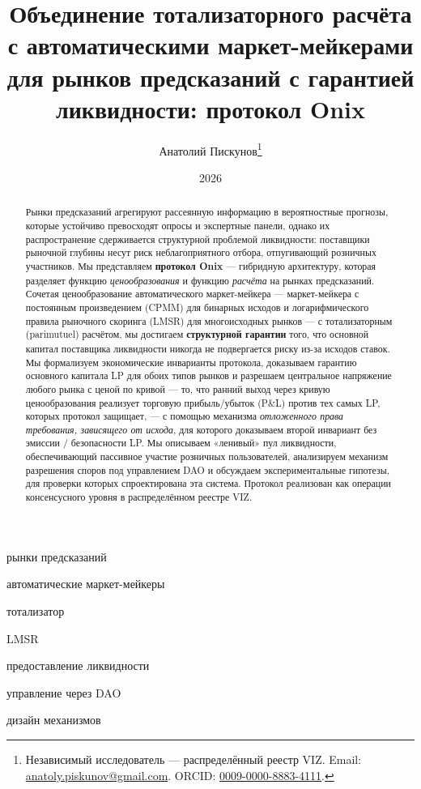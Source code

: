 \documentclass{ledger}
\title{Объединение тотализаторного расчёта с автоматическими маркет-мейкерами
для рынков предсказаний с гарантией ликвидности: протокол Onix}
\author{Анатолий Пискунов\thanks{Независимый исследователь --- распределённый
реестр VIZ. Email: \href{mailto:anatoly.piskunov@gmail.com}{anatoly.piskunov@gmail.com}.
ORCID: \href{https://orcid.org/0009-0000-8883-4111}{0009-0000-8883-4111}.}}
\date{2026}
\theoremstyle{plain}
\theoremstyle{remark}
\begin{document}
\maketitle

\begin{abstract}
Рынки предсказаний агрегируют рассеянную информацию в вероятностные прогнозы,
которые устойчиво превосходят опросы и экспертные панели, однако их
распространение сдерживается структурной проблемой ликвидности: поставщики
рыночной глубины несут риск неблагоприятного отбора, отпугивающий розничных
участников. Мы представляем \textbf{протокол Onix} --- гибридную архитектуру,
которая разделяет функцию \emph{ценообразования} и функцию \emph{расчёта} на
рынках предсказаний. Сочетая ценообразование автоматического маркет-мейкера ---
маркет-мейкера с постоянным произведением (CPMM) для бинарных исходов и
логарифмического правила рыночного скоринга (LMSR) для многоисходных рынков ---
с тотализаторным (parimutuel) расчётом, мы достигаем \textbf{структурной
гарантии} того, что основной капитал поставщика ликвидности никогда не
подвергается риску из-за исходов ставок. Мы формализуем экономические инварианты
протокола, доказываем гарантию основного капитала LP для обоих типов рынков и
разрешаем центральное напряжение любого рынка с ценой по кривой --- то, что
ранний выход через кривую ценообразования реализует торговую прибыль/убыток
(P\&L) против тех самых LP, которых протокол защищает, --- с помощью механизма
\emph{отложенного права требования, зависящего от исхода}, для которого доказываем
второй инвариант без эмиссии / безопасности LP. Мы описываем «ленивый» пул
ликвидности, обеспечивающий пассивное участие розничных пользователей,
анализируем механизм разрешения споров под управлением DAO и обсуждаем
экспериментальные гипотезы, для проверки которых спроектирована эта система.
Протокол реализован как операции консенсусного уровня в распределённом реестре
VIZ.
\end{abstract}

\begin{keywords}
\item{рынки предсказаний} \item{автоматические маркет-мейкеры} \item{тотализатор} \item{LMSR} \item{предоставление ликвидности} \item{управление через DAO} \item{дизайн механизмов}
\end{keywords}
\end{document}
